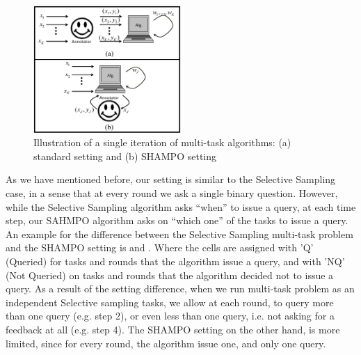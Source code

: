 \begin{figure}
\begin{centering}
\includegraphics[width=0.5\textwidth]{figs/SHAMPO_illustration.eps}
\caption{Illustration of a single iteration of  multi-task algorithms: (a) standard setting and (b) SHAMPO setting}
\label{fig:ilustration}
\end{centering}
\end{figure}

As we have mentioned before, our setting is similar to the Selective Sampling 
case, in a sense that at every round we ask a single binary question. However, 
while the Selective Sampling algorithm asks ``when'' to issue a query, at each time step, our SAHMPO 
algorithm asks on ``which one'' of the tasks to issue a query. 
An example for the difference between the Selective Sampling multi-task problem and 
the SHAMPO setting is  and 
. Where the cells are assigned with 'Q' (Queried) for tasks and 
rounds that the algorithm issue a query, and with 'NQ' (Not Queried) on tasks 
and rounds that the algorithm decided not to issue a query.
As a result of the setting difference, when we run multi-task problem as an independent Selective sampling 
tasks, we allow at each round, to query more than one query 
(e.g.  step 2), or even less than one query, i.e. 
not asking for a feedback at all (e.g.  step 4). 
The SHAMPO setting on the other hand, is more 
limited, since for every round, the algorithm  issue one, and only one query. 




